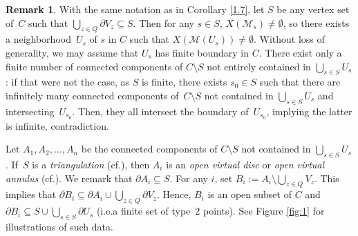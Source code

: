 \documentclass[10pt]{amsart}
\newcommand{\ie}{i.e.}
\newcommand{\cf}{cf.}
\let\backslash\setminus
\theoremstyle{definition}
\newtheorem{rem}[thm]{Remark}
\begin{document}
\begin{rem} \label{1.11} With the same notation as in Corollary \ref{1.7}, let $S$ be any vertex set of~$C$ such that $\bigcup_{z \in Q} \partial{V_z} \subseteq S$. Then for any $s \in S$, $X(\mathscr{M}_s) \neq \emptyset$, so there exists a neighborhood~$U_s$ of $s$ in $C$ such that $X(\mathscr{M}(U_s)) \neq \emptyset$. Without loss of generality, we may assume that $U_s$ has finite boundary in $C$.
There exist only a finite number of connected components of $C \backslash S$ not entirely contained in $\bigcup_{s \in S} U_s$: if that were not the case, as $S$ is finite, there exists $s_0 \in S$ such that there are infinitely many connected components of~$C \backslash S$ not contained in $\bigcup_{s\in S} U_s$ and intersecting~$U_{s_0}$. Then, they all intersect the boundary of~$U_{s_0}$, implying the latter is infinite, contradiction.

Let $A_1, A_2, \dots, A_n$ be the connected components of $C \backslash S$ not contained in $\bigcup_{s \in S} U_s$. If~$S$ is a \emph{triangulation} (\cf \cite[5.1.13]{duc}), then $A_i$ is an \emph{open virtual disc} or \emph{open virtual annulus} (\cf \cite[p.\,210]{duc}).
We remark that $\partial{A_i} \subseteq S$. For any $i$, set $B_i:= A_i \backslash \bigcup_{z \in Q} V_z$. This implies that $\partial{B_i} \subseteq \partial{A_i} \cup \bigcup_{z \in Q} \partial{V_z}$. Hence, $B_i$ is an open subset of $C$ and $\partial{B_i} \subseteq S \cup \bigcup_{s \in S} \partial{U_s}$ (\ie a finite set of type~$2$ points). See Figure \ref{fig:1} for illustrations of such data.


\end{rem}
\end{document}
